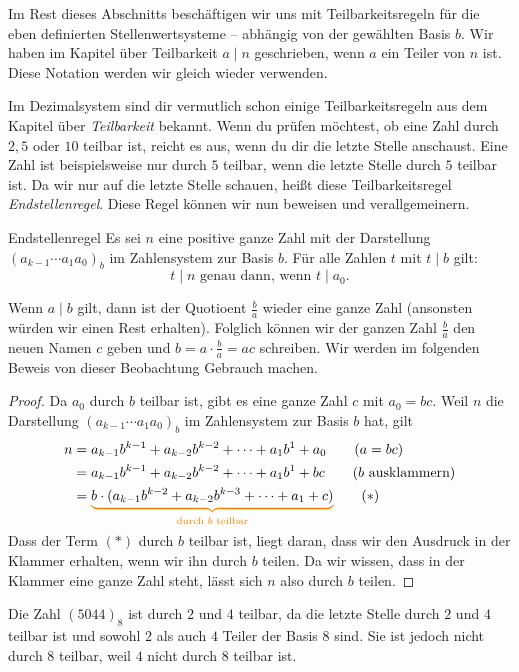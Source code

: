 \documentclass[../../main.tex]{subfiles}
\begin{document}
Im Rest dieses Abschnitts beschäftigen wir uns mit Teilbarkeitsregeln für die eben definierten Stellenwertsysteme -- abhängig von der gewählten Basis $b$. Wir haben im Kapitel über Teilbarkeit $a\mid n$ geschrieben, wenn $a$ ein Teiler von $n$ ist. Diese Notation werden wir gleich wieder verwenden.

Im Dezimalsystem sind dir vermutlich schon einige Teilbarkeitsregeln aus dem Kapitel über \emph{Teilbarkeit} bekannt. Wenn du prüfen möchtest, ob eine Zahl durch $2, 5$ oder $10$ teilbar ist, reicht es aus, wenn du dir die letzte Stelle anschaust. Eine Zahl ist beispielsweise nur durch $5$ teilbar, wenn die letzte Stelle durch $5$ teilbar ist. Da wir nur auf die letzte Stelle schauen, heißt diese Teilbarkeitsregel \emph{Endstellenregel}. Diese Regel können wir nun beweisen und verallgemeinern.
\begin{theorem}{Endstellenregel}
    Es sei $n$ eine positive ganze Zahl mit der Darstellung $(a_{k-1}\cdots a_1a_0)_b$ im Zahlensystem zur Basis $b$. Für alle Zahlen $t$ mit $t\mid b$ gilt:
    \[t\mid n\text{ genau dann, wenn }t\mid a_0.\]
\end{theorem}
Wenn $a\mid b$ gilt, dann ist der Quotioent $\frac{b}{a}$ wieder eine ganze Zahl (ansonsten würden wir einen Rest erhalten). Folglich können wir der ganzen Zahl $\frac{b}{a}$ den neuen Namen $c$ geben und $b=a\cdot\frac{b}{a}=ac$ schreiben. Wir werden im folgenden Beweis von dieser Beobachtung Gebrauch machen.
\begin{proof}
    Da $a_0$ durch $b$ teilbar ist, gibt es eine ganze Zahl $c$ mit $a_0=bc$. Weil $n$ die Darstellung $(a_{k-1}\cdots a_1a_0)_b$ im Zahlensystem zur Basis $b$ hat, gilt
    \begin{align*}
        n&=a_{k-1}b^{k-1}+a_{k-2}b^{k-2}+\dots+a_1b^1+a_0\tag{$a=bc$}\\
        &=a_{k-1}b^{k-1}+a_{k-2}b^{k-2}+\dots+a_1b^1+bc\tag{$b$ ausklammern}\\
        &=\colorbrace{b\cdot(a_{k-1}b^{k-2}+a_{k-2}b^{k-3}+\dots+a_1+c)}{\text{durch }b\text{ teilbar}}\tag{$*$}
    \end{align*}
    Dass der Term $(*)$ durch $b$ teilbar ist, liegt daran, dass wir den Ausdruck in der Klammer erhalten, wenn wir ihn durch $b$ teilen. Da wir wissen, dass in der Klammer eine ganze Zahl steht, lässt sich $n$ also durch $b$ teilen.
\end{proof}
\begin{example}{}
    Die Zahl $(5044)_8$ ist durch $2$ und $4$ teilbar, da die letzte Stelle durch $2$ und $4$ teilbar ist und sowohl $2$ als auch $4$ Teiler der Basis $8$ sind. Sie ist jedoch nicht durch $8$ teilbar, weil $4$ nicht durch $8$ teilbar ist.
\end{example}
\end{document}
